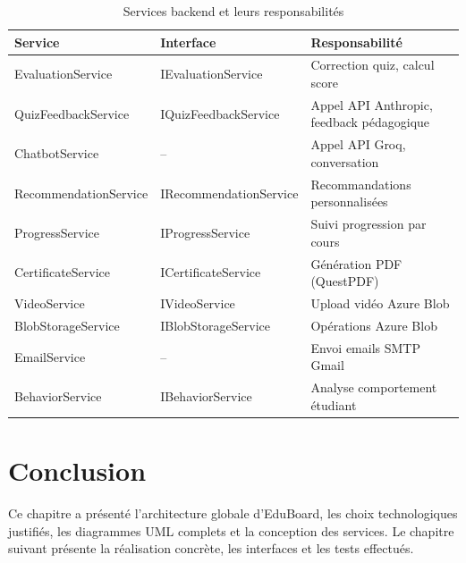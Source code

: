 \begin{table}[H]
  \centering
  \caption{Services backend et leurs responsabilités}
  \label{tab:services}
  \begin{tabularx}{\textwidth}{llX}
    \toprule
    \textbf{Service} & \textbf{Interface} & \textbf{Responsabilité} \\
    \midrule
    EvaluationService       & IEvaluationService       & Correction quiz, calcul score \\
    QuizFeedbackService     & IQuizFeedbackService     & Appel API Anthropic, feedback pédagogique \\
    ChatbotService          & –                        & Appel API Groq, conversation \\
    RecommendationService   & IRecommendationService   & Recommandations personnalisées \\
    ProgressService         & IProgressService         & Suivi progression par cours \\
    CertificateService      & ICertificateService      & Génération PDF (QuestPDF) \\
    VideoService            & IVideoService            & Upload vidéo Azure Blob \\
    BlobStorageService      & IBlobStorageService      & Opérations Azure Blob \\
    EmailService            & –                        & Envoi emails SMTP Gmail \\
    BehaviorService         & IBehaviorService         & Analyse comportement étudiant \\
    \bottomrule
  \end{tabularx}
\end{table}

\section*{Conclusion}

Ce chapitre a présenté l'architecture globale d'EduBoard, les choix technologiques
justifiés, les diagrammes \ac{UML} complets et la conception des services. Le chapitre
suivant présente la réalisation concrète, les interfaces et les tests effectués.
